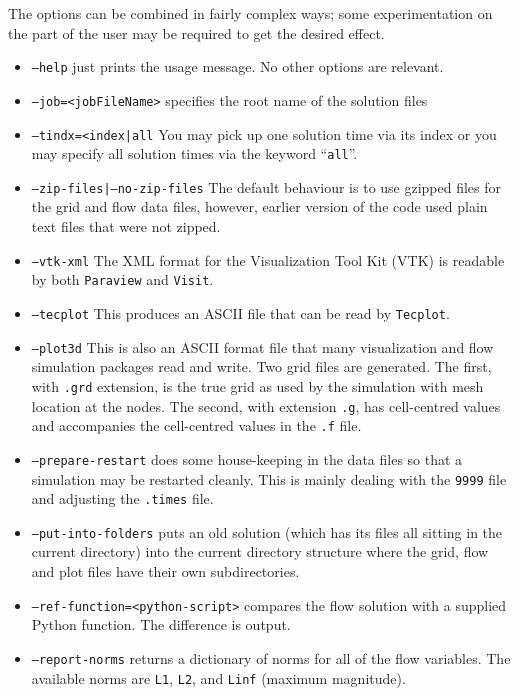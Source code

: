 \documentclass[12pt,a4paper,twoside]{article}
\begin{document}
\noindent
The options can be combined in fairly complex ways; some experimentation on the part of the user
may be required to get the desired effect.
\begin{itemize}
  \item \texttt{--help} just prints the usage message.  No other options are relevant.
  \item \texttt{--job=<jobFileName>} specifies the root name of the solution files
  \item \texttt{--tindx=<index|all} You may pick up one solution time via its index or you may
     specify all solution times via the keyword ``\texttt{all}''.
  \item \texttt{--zip-files|--no-zip-files} The default behaviour is to use gzipped files for the
     grid and flow data files, however, earlier version of the code used plain text files that were not zipped.
  \item \texttt{--vtk-xml} The XML format for the Visualization Tool Kit (VTK) is readable by both \texttt{Paraview}
     and \texttt{Visit}.
  \item \texttt{--tecplot} This produces an ASCII file that can be read by \texttt{Tecplot}.
  \item \texttt{--plot3d} This is also an ASCII format file that many visualization and flow simulation
     packages read and write.
     Two grid files are generated.  The first, with \texttt{.grd} extension, 
     is the true grid as used by the simulation with mesh location at the nodes.  
     The second, with extension \texttt{.g}, has cell-centred values and accompanies 
     the cell-centred values in the \texttt{.f} file.
  \item \texttt{--prepare-restart} does some house-keeping in the data files so that a simulation 
     may be restarted cleanly.  
     This is mainly dealing with the \texttt{9999} file and adjusting the \texttt{.times} file.
  \item \texttt{--put-into-folders} puts an old solution (which has its files all sitting in the current directory)
     into the current directory structure where the grid, flow and plot files have their own subdirectories.
  \item \texttt{--ref-function=<python-script>} compares the flow solution with a supplied Python function.
     The difference is output.
  \item \texttt{--report-norms} returns a dictionary of norms for all of the flow variables.
    The available norms are \texttt{L1}, \texttt{L2}, and \texttt{Linf} (maximum magnitude).

\end{itemize}
\end{document}
